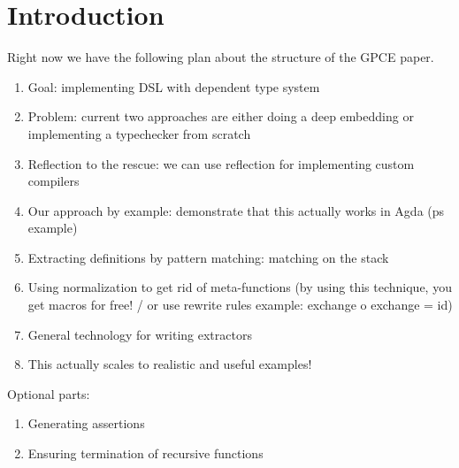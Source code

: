 \documentclass[sigplan,anonymous,review]{acmart}
\begin{document}
\section{Introduction}
Right now we have the following plan about the structure of the GPCE paper.
\begin{enumerate}
    \item Goal: implementing DSL with dependent type system 
    \item Problem: current two approaches are either doing a deep embedding or
        implementing a typechecker from scratch
    \item Reflection to the rescue: we can use reflection for implementing
        custom compilers 
    \item Our approach by example: demonstrate that this actually works in Agda
        (ps example)
    \item Extracting definitions by pattern matching: matching on the stack
    \item Using normalization to get rid of meta-functions (by using this
        technique, you get macros for free! / or use rewrite rules example:
        exchange o exchange = id)
    \item General technology for writing extractors
    \item This actually scales to realistic and useful examples!
\end{enumerate}

Optional parts:
\begin{enumerate}
    \item Generating assertions
    \item Ensuring termination of recursive functions
\end{enumerate}
\end{document}
